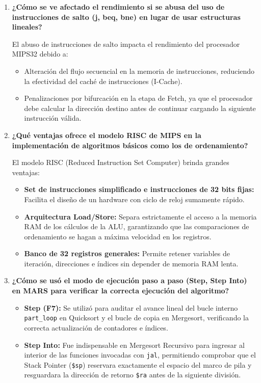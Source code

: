 \documentclass[12pt,letterpaper]{article}
\begin{document}
\begin{enumerate}
    \item \textbf{\large\color{UCBlue}¿Cómo se ve afectado el rendimiento si se abusa del uso de instrucciones de salto (j, beq, bne) en lugar de usar estructuras lineales?}
    
    \vspace{0.2cm}
    El abuso de instrucciones de salto impacta el rendimiento del procesador MIPS32 debido a:
    \begin{itemize}
        \item Alteración del flujo secuencial en la memoria de instrucciones, reduciendo la efectividad del caché de instrucciones (I-Cache).
        \item Penalizaciones por bifurcación en la etapa de Fetch, ya que el procesador debe calcular la dirección destino antes de continuar cargando la siguiente instrucción válida.
    \end{itemize}

    \item \textbf{\large\color{UCBlue}¿Qué ventajas ofrece el modelo RISC de MIPS en la implementación de algoritmos básicos como los de ordenamiento?}
    
    \vspace{0.2cm}
    El modelo RISC (Reduced Instruction Set Computer) brinda grandes ventajas:
    \begin{itemize}
        \item \textbf{Set de instrucciones simplificado e instrucciones de 32 bits fijas:} Facilita el diseño de un hardware con ciclo de reloj sumamente rápido.
        \item \textbf{Arquitectura Load/Store:} Separa estrictamente el acceso a la memoria RAM de los cálculos de la ALU, garantizando que las comparaciones de ordenamiento se hagan a máxima velocidad en los registros.
        \item \textbf{Banco de 32 registros generales:} Permite retener variables de iteración, direcciones e índices sin depender de memoria RAM lenta.
    \end{itemize}

    \item \textbf{\large\color{UCBlue}¿Cómo se usó el modo de ejecución paso a paso (Step, Step Into) en MARS para verificar la correcta ejecución del algoritmo?}
    
    \vspace{0.2cm}
    \begin{itemize}
        \item \textbf{Step (F7):} Se utilizó para auditar el avance lineal del bucle interno \texttt{part\_loop} en Quicksort y el bucle de copia en Mergesort, verificando la correcta actualización de contadores e índices.
        \item \textbf{Step Into:} Fue indispensable en Mergesort Recursivo para ingresar al interior de las funciones invocadas con \texttt{jal}, permitiendo comprobar que el Stack Pointer (\texttt{\$sp}) reservara exactamente el espacio del marco de pila y resguardara la dirección de retorno \texttt{\$ra} antes de la siguiente división.
    \end{itemize}


\end{enumerate}
\end{document}
